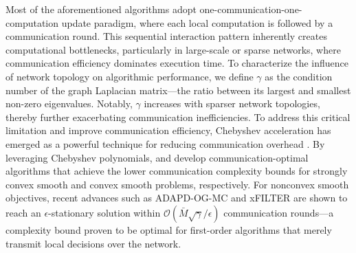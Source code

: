 \documentclass[12pt,draftcls,onecolumn]{IEEEtran}
\begin{document}
Most of the aforementioned algorithms \cite{hong2016convergence,hong_distributed_2018,yi2022sublinear,yi2021linear,hong_prox-pda_2017} adopt one-communication-one-computation update paradigm, where each local computation is followed by a communication round. This sequential interaction pattern inherently creates computational bottlenecks, particularly in large-scale or sparse networks, where communication efficiency dominates execution time. To characterize the influence of network topology on algorithmic performance, we define $\gamma$ as the condition number of the graph Laplacian matrix—the ratio between its largest and smallest non-zero eigenvalues. Notably, $\gamma$ increases with sparser network topologies, thereby further exacerbating communication inefficiencies. To address this critical limitation and improve communication efficiency, Chebyshev acceleration has emerged as a powerful technique for reducing communication overhead \cite{arioli2014chebyshev}. By leveraging Chebyshev polynomials, \cite{scaman2017optimal} and \cite{xu2020accelerated} develop communication-optimal algorithms that achieve the lower communication complexity bounds for strongly convex smooth and convex smooth problems, respectively. For nonconvex smooth objectives, recent advances such as ADAPD-OG-MC \cite{mancino2023decentralized} and xFILTER \cite{sun_distributed_2019} are shown to reach an $\epsilon$-stationary solution within $\mathcal{O}(\bar{M}\sqrt{\gamma}/\epsilon)$ communication rounds—a complexity bound proven to be optimal for first-order algorithms that merely transmit local decisions over the network.
\end{document}
